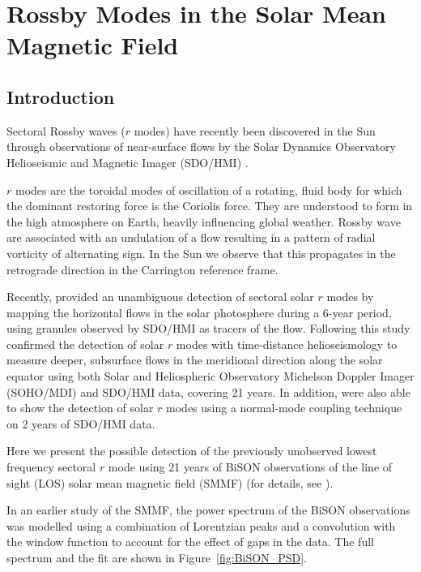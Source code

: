 \chapter{Rossby Modes in the Solar Mean Magnetic Field}\label{chap:rmode}

\section{Introduction}\label{sec:rmode_intro}


Sectoral Rossby waves ($r$ modes) have recently been discovered in the Sun through observations of near-surface flows by the Solar Dynamics Observatory Helioseismic and Magnetic Imager (SDO/HMI) \citep{loptien_global-scale_2018, liang_time-distance_2019}.

$r$ modes are the toroidal modes of oscillation of a rotating, fluid body \citep{lanza_sectoral_2019} for which the dominant restoring force is the Coriolis force. They are understood to form in the high atmosphere on Earth, heavily influencing global weather. Rossby wave are associated with an undulation of a flow resulting in a pattern of radial vorticity of alternating sign. In the Sun we observe that this propagates in the retrograde direction in the Carrington reference frame.

Recently, \citet{loptien_global-scale_2018} provided an unambiguous detection of sectoral solar $r$ modes by mapping the horizontal flows in the solar photosphere during a 6-year period, using granules observed by SDO/HMI as tracers of the flow. Following this study \citet{liang_time-distance_2019} confirmed the detection of solar $r$ modes with time-distance helioseismology to measure deeper, subsurface flows in the meridional direction along the solar equator using both Solar and Heliospheric Observatory Michelson Doppler Imager (SOHO/MDI) and SDO/HMI data, covering 21 years. In addition, \citet{hanasoge_detection_2019} were also able to show the detection of solar $r$ modes using a normal-mode coupling technique on 2 years of SDO/HMI data.

Here we present the possible detection of the previously unobserved lowest frequency sectoral $r$ mode using 21 years of BiSON observations of the line of sight (LOS) solar mean magnetic field (SMMF) (for details, see \citet{chaplin_studies_2003}).

In an earlier study of the SMMF, the power spectrum of the BiSON observations was modelled using a combination of Lorentzian peaks and a convolution with the window function to account for the effect of gaps in the data. The full spectrum and the fit are shown in Figure~\ref{fig:BiSON_PSD}.

